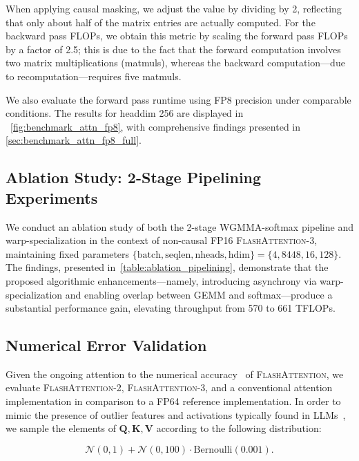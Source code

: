 \begin{algorithm}[H]
\begin{algorithmic}[1]
\begin{itemize}
When applying causal masking, we adjust the value by dividing by 2, reflecting that only about half of the matrix entries are actually computed. For the backward pass FLOPs, we obtain this metric by scaling the forward pass FLOPs by a factor of 2.5; this is due to the fact that the forward computation involves two matrix multiplications (matmuls), whereas the backward computation—due to recomputation—requires five matmuls.

We also evaluate the forward pass runtime using FP8 precision under comparable conditions. The results for headdim 256 are displayed in ~\cref{fig:benchmark_attn_fp8}, with comprehensive findings presented in \cref{sec:benchmark_attn_fp8_full}.

\subsection{Ablation Study: 2-Stage Pipelining Experiments}
\label{sec:2-stage-pipelining-experiments}

We conduct an ablation study of both the 2-stage WGMMA-softmax pipeline and warp-specialization in the context of non-causal FP16 \textsc{FlashAttention-3}, maintaining fixed parameters $\{\text{batch}, \text{seqlen}, \text{nheads}, \text{hdim}\} = \{ 4, 8448, 16, 128\}$. The findings, presented in~\cref{table:ablation_pipelining}, demonstrate that the proposed algorithmic enhancements—namely, introducing asynchrony via warp-specialization and enabling overlap between GEMM and softmax—produce a substantial performance gain, elevating throughput from 570 to 661 TFLOPs.

\subsection{Numerical Error Validation}
\label{sec:numerical_error}

Given the ongoing attention to the numerical accuracy~\citep{golden2024flash} of \textsc{FlashAttention}, we evaluate \textsc{FlashAttention-2}, \textsc{FlashAttention-3}, and a conventional attention implementation in comparison to a FP64 reference implementation. In order to mimic the presence of outlier features and activations typically found in LLMs~\citep{dettmers2208llm, sun2024massive}, we sample the elements of $\mathbf{Q}, \mathbf{K}, \mathbf{V}$ according to the following distribution:

\begin{equation*}
  \mathcal{N}(0, 1) + \mathcal{N}(0, 100) \cdot \mathrm{Bernoulli}(0.001).
\end{equation*}


\end{itemize}
\end{algorithmic}
\end{algorithm}
